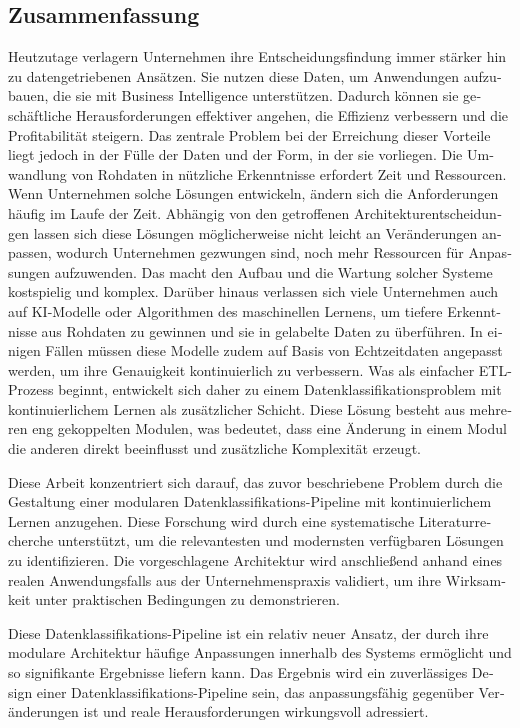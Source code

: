 \begin{otherlanguage}{ngerman}
    \chapter*{Zusammenfassung}
    Heutzutage verlagern Unternehmen ihre Entscheidungsfindung immer stärker hin zu datengetriebenen Ansätzen. Sie nutzen diese Daten, um Anwendungen aufzubauen, die sie mit Business Intelligence unterstützen. Dadurch können sie geschäftliche Herausforderungen effektiver angehen, die Effizienz verbessern und die Profitabilität steigern. Das zentrale Problem bei der Erreichung dieser Vorteile liegt jedoch in der Fülle der Daten und der Form, in der sie vorliegen. Die Umwandlung von Rohdaten in nützliche Erkenntnisse erfordert Zeit und Ressourcen. Wenn Unternehmen solche Lösungen entwickeln, ändern sich die Anforderungen häufig im Laufe der Zeit. Abhängig von den getroffenen Architekturentscheidungen lassen sich diese Lösungen möglicherweise nicht leicht an Veränderungen anpassen, wodurch Unternehmen gezwungen sind, noch mehr Ressourcen für Anpassungen aufzuwenden. Das macht den Aufbau und die Wartung solcher Systeme kostspielig und komplex. Darüber hinaus verlassen sich viele Unternehmen auch auf KI-Modelle oder Algorithmen des maschinellen Lernens, um tiefere Erkenntnisse aus Rohdaten zu gewinnen und sie in gelabelte Daten zu überführen. In einigen Fällen müssen diese Modelle zudem auf Basis von Echtzeitdaten angepasst werden, um ihre Genauigkeit kontinuierlich zu verbessern. Was als einfacher ETL-Prozess beginnt, entwickelt sich daher zu einem Datenklassifikationsproblem mit kontinuierlichem Lernen als zusätzlicher Schicht. Diese Lösung besteht aus mehreren eng gekoppelten Modulen, was bedeutet, dass eine Änderung in einem Modul die anderen direkt beeinflusst und zusätzliche Komplexität erzeugt.
    \smallbreak

    Diese Arbeit konzentriert sich darauf, das zuvor beschriebene Problem durch die Gestaltung einer modularen Datenklassifikations-Pipeline mit kontinuierlichem Lernen anzugehen. Diese Forschung wird durch eine systematische Literaturrecherche unterstützt, um die relevantesten und modernsten verfügbaren Lösungen zu identifizieren. Die vorgeschlagene Architektur wird anschließend anhand eines realen Anwendungsfalls aus der Unternehmenspraxis validiert, um ihre Wirksamkeit unter praktischen Bedingungen zu demonstrieren.
    \smallbreak

    Diese Datenklassifikations-Pipeline ist ein relativ neuer Ansatz, der durch ihre modulare Architektur häufige Anpassungen innerhalb des Systems ermöglicht und so signifikante Ergebnisse liefern kann. Das Ergebnis wird ein zuverlässiges Design einer Datenklassifikations-Pipeline sein, das anpassungsfähig gegenüber Veränderungen ist und reale Herausforderungen wirkungsvoll adressiert.

\end{otherlanguage}
